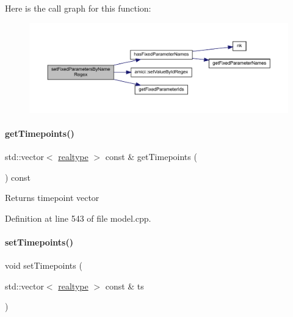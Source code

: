 Here is the call graph for this function\+:
\nopagebreak
\begin{figure}[H]
\begin{center}
\leavevmode
\includegraphics[width=350pt]{classamici_1_1_model_a4802f7d56264e3b592c167da8166cb73_cgraph}
\end{center}
\end{figure}
\mbox{\label{classamici_1_1_model_a50ea5198d117f8f4ad1e34bb279975c8}} 
\paragraph{\texorpdfstring{get\+Timepoints()}{getTimepoints()}}
{\footnotesize\ttfamily std\+::vector$<$ \mbox{\hyperlink{namespaceamici_a1bdce28051d6a53868f7ccbf5f2c14a3}{realtype}} $>$ const  \& get\+Timepoints (\begin{DoxyParamCaption}{ }\end{DoxyParamCaption}) const}

\begin{DoxyReturn}{Returns}
timepoint vector 
\end{DoxyReturn}


Definition at line 543 of file model.\+cpp.

\mbox{\label{classamici_1_1_model_a50f9642f9bcb883dbd3925c85abc4c24}} 
\paragraph{\texorpdfstring{set\+Timepoints()}{setTimepoints()}}
{\footnotesize\ttfamily void set\+Timepoints (\begin{DoxyParamCaption}\item[{std\+::vector$<$ \mbox{\hyperlink{namespaceamici_a1bdce28051d6a53868f7ccbf5f2c14a3}{realtype}} $>$ const \&}]{ts }\end{DoxyParamCaption})}


